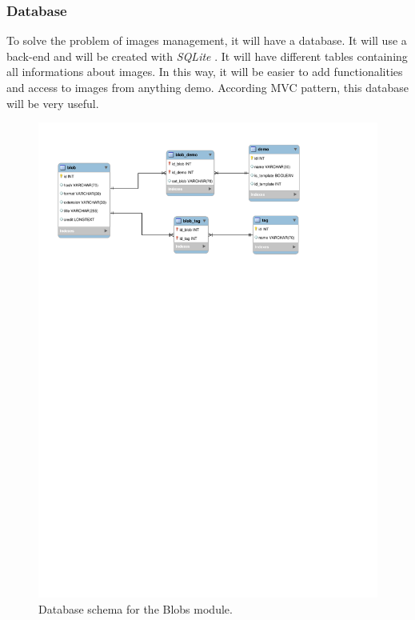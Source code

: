 \subsubsection{Database}

To solve the problem of images management, it will have a database. It will use a
back-end and will be created with \emph{SQLite} \cite{SQLite}.
It will have different tables
containing all informations about images. In this way, it will be easier to
add functionalities and access to images from anything demo. According MVC pattern,
this database will be very useful. 

\begin{figure}[H]
  \centering
  \includegraphics[width=5in]{blobs/images/images_bdd}
  \caption{Database schema for the Blobs module. }
  \label{img:images_bdd}
\end{figure}

